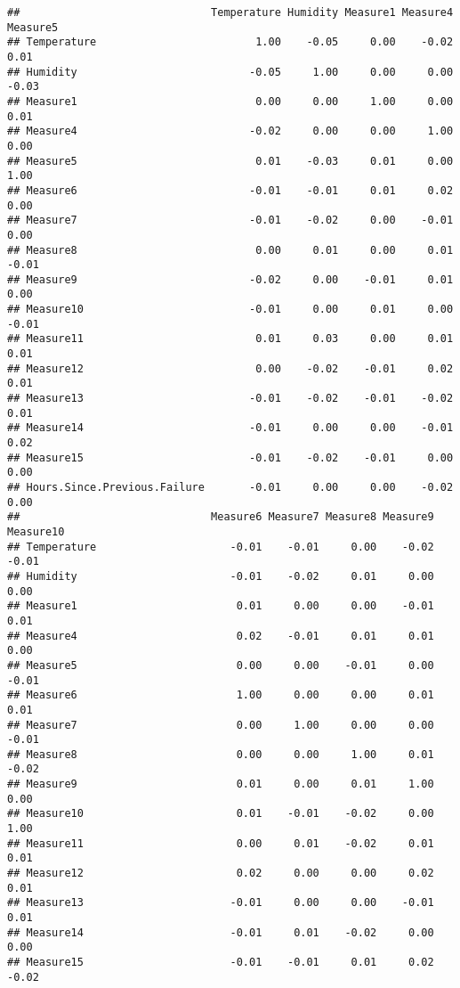 \documentclass[
]{article}
\begin{document}
\begin{verbatim}
##                              Temperature Humidity Measure1 Measure4 Measure5
## Temperature                         1.00    -0.05     0.00    -0.02     0.01
## Humidity                           -0.05     1.00     0.00     0.00    -0.03
## Measure1                            0.00     0.00     1.00     0.00     0.01
## Measure4                           -0.02     0.00     0.00     1.00     0.00
## Measure5                            0.01    -0.03     0.01     0.00     1.00
## Measure6                           -0.01    -0.01     0.01     0.02     0.00
## Measure7                           -0.01    -0.02     0.00    -0.01     0.00
## Measure8                            0.00     0.01     0.00     0.01    -0.01
## Measure9                           -0.02     0.00    -0.01     0.01     0.00
## Measure10                          -0.01     0.00     0.01     0.00    -0.01
## Measure11                           0.01     0.03     0.00     0.01     0.01
## Measure12                           0.00    -0.02    -0.01     0.02     0.01
## Measure13                          -0.01    -0.02    -0.01    -0.02     0.01
## Measure14                          -0.01     0.00     0.00    -0.01     0.02
## Measure15                          -0.01    -0.02    -0.01     0.00     0.00
## Hours.Since.Previous.Failure       -0.01     0.00     0.00    -0.02     0.00
##                              Measure6 Measure7 Measure8 Measure9 Measure10
## Temperature                     -0.01    -0.01     0.00    -0.02     -0.01
## Humidity                        -0.01    -0.02     0.01     0.00      0.00
## Measure1                         0.01     0.00     0.00    -0.01      0.01
## Measure4                         0.02    -0.01     0.01     0.01      0.00
## Measure5                         0.00     0.00    -0.01     0.00     -0.01
## Measure6                         1.00     0.00     0.00     0.01      0.01
## Measure7                         0.00     1.00     0.00     0.00     -0.01
## Measure8                         0.00     0.00     1.00     0.01     -0.02
## Measure9                         0.01     0.00     0.01     1.00      0.00
## Measure10                        0.01    -0.01    -0.02     0.00      1.00
## Measure11                        0.00     0.01    -0.02     0.01      0.01
## Measure12                        0.02     0.00     0.00     0.02      0.01
## Measure13                       -0.01     0.00     0.00    -0.01      0.01
## Measure14                       -0.01     0.01    -0.02     0.00      0.00
## Measure15                       -0.01    -0.01     0.01     0.02     -0.02

\end{verbatim}
\end{document}
